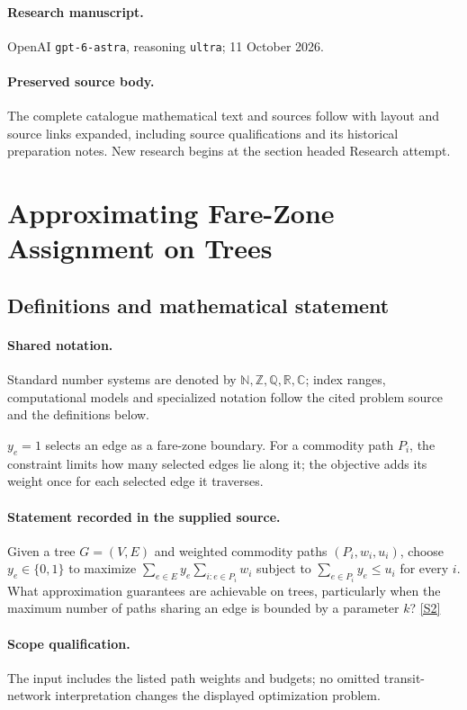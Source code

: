 \documentclass[11pt]{article}
\begin{document}
\paragraph{Research manuscript.} OpenAI \texttt{gpt-6-astra}, reasoning \texttt{ultra}; 11 October 2026.
\paragraph{Preserved source body.} The complete catalogue mathematical text and sources follow with layout and source links expanded, including source qualifications and its historical preparation notes. New research begins at the section headed Research attempt.

\section{Approximating Fare-Zone Assignment on Trees}\label{statement}

\subsection{Definitions and mathematical statement}

\paragraph{Shared notation.}Standard number systems are denoted by $\mathbb N,\mathbb Z,\mathbb Q,\mathbb R,\mathbb C$; index ranges, computational models and specialized notation follow the cited problem source and the definitions below.


$y_e=1$ selects an edge as a fare-zone boundary. For a commodity path $P_i$, the constraint limits how many selected edges lie along it; the objective adds its weight once for each selected edge it traverses.
\paragraph{Statement recorded in the supplied source.}
Given a tree $G=(V,E)$ and weighted commodity paths $(P_i,w_i,u_i)$, choose $y_e\in\{0,1\}$ to maximize $\sum_{e\in E}y_e\sum_{i:e\in P_i}w_i$ subject to $\sum_{e\in P_i}y_e\leq u_i$ for every $i$. What approximation guarantees are achievable on trees, particularly when the maximum number of paths sharing an edge is bounded by a parameter $k$? \href{https://doi.org/10.4171/owr/2024/50}{[S2]}
\paragraph{Scope qualification.}
The input includes the listed path weights and budgets; no omitted transit-network interpretation changes the displayed optimization problem.
\end{document}
